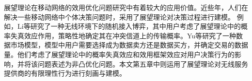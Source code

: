 %

展望理论在移动网络的效用优化问题研究中有着较大的应用价值。近些年，人们在解决一些移动网络中个体决策问题时，采用了展望理论对决策过程进行建模。 例如，Li等\cite{Tianming}研究了一种无线环境下的随机接入博弈，其中用户考虑了展望理论中的{\kaishu 概率失真效应}作用，策略性地确定其在冲突信道上的传输概率。Yu等\cite{Yu}研究了一种数据市场模型，模型中用户需要选择成为数据卖方还是数据买方，并确定交易的数据量。他们考虑了展望理论中的{\kaishu 概率失真效应}和{\kaishu 效用框架效应}对用户决策行为的影响，并将该问题表述为非凸优化问题。本文第五章中则运用了展望理论对无线服务提供商的有限理性行为进行刻画与建模。

